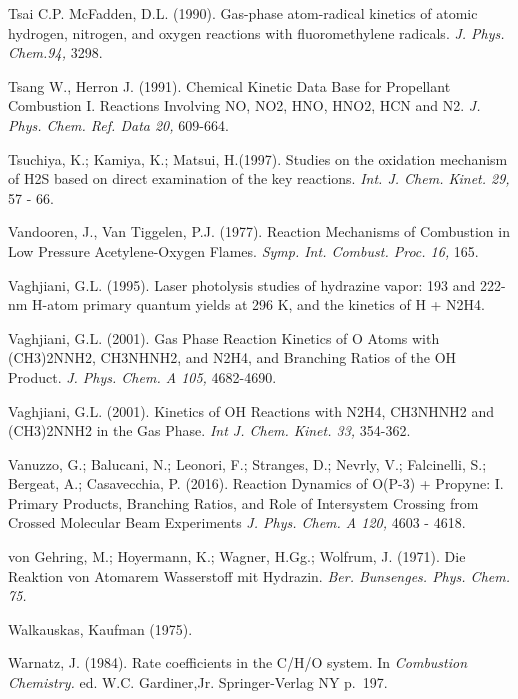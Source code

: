 \documentclass[12pt,landscape]{article}
\newcounter{reaction}
\newcounter{photo}
\begin{document}
Tsai C.P. McFadden, D.L. (1990). Gas-phase atom-radical kinetics of atomic hydrogen, nitrogen, and oxygen reactions with fluoromethylene radicals.  {\em J. Phys. Chem.94,} 3298.

Tsang W., Herron J. (1991).
Chemical Kinetic Data Base for Propellant Combustion I. Reactions Involving NO, NO2, HNO, HNO2, HCN and N2.
{\em J. Phys. Chem. Ref. Data 20,} 609-664.

Tsuchiya, K.; Kamiya, K.; Matsui, H.(1997). 
Studies on the oxidation mechanism of H2S based on direct examination of the key reactions.
{\it Int. J. Chem. Kinet. 29,} 57 - 66.

Vandooren, J., Van Tiggelen, P.J. (1977). Reaction Mechanisms of Combustion in Low Pressure Acetylene-Oxygen Flames. {\em Symp. Int. Combust. Proc. 16,} 165.

Vaghjiani, G.L. (1995).  Laser photolysis studies of hydrazine vapor: 193 and 222-nm H-atom primary quantum yields at 296 K, and the kinetics of H + N2H4.   

Vaghjiani, G.L. (2001).  Gas Phase Reaction Kinetics of O Atoms with (CH3)2NNH2, CH3NHNH2, and N2H4, and Branching Ratios of the OH Product. 
{\em J. Phys. Chem. A 105,} 4682-4690.

Vaghjiani, G.L. (2001).  Kinetics of OH Reactions with N2H4, CH3NHNH2 and (CH3)2NNH2 in the Gas Phase. {\em Int J. Chem. Kinet. 33,} 354-362.

Vanuzzo, G.; Balucani, N.; Leonori, F.; Stranges, D.; Nevrly, V.; Falcinelli, S.; Bergeat, A.; Casavecchia, P. (2016).
Reaction Dynamics of O(P-3) + Propyne: I. Primary Products, Branching Ratios, and Role of Intersystem Crossing from Crossed Molecular Beam Experiments
{\em J. Phys. Chem. A 120,} 4603 - 4618.

von Gehring, M.; Hoyermann, K.; Wagner, H.Gg.; Wolfrum, J. (1971).  Die Reaktion von Atomarem Wasserstoff mit Hydrazin. 
{\em Ber. Bunsenges. Phys. Chem. 75.}


Walkauskas, Kaufman (1975). 

Warnatz, J. (1984).  Rate coefficients in the C/H/O system.  In {\em Combustion Chemistry.} ed. W.C. Gardiner,Jr.  Springer-Verlag NY p.\ 197.
\end{document}
